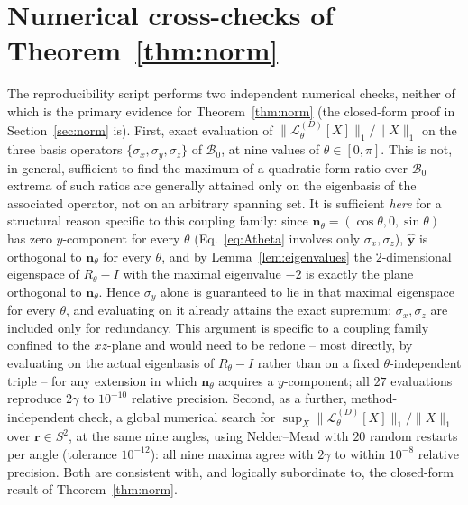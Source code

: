 \documentclass[aps,pra,reprint,superscriptaddress,nofootinbib,longbibliography]{revtex4-2}
\begin{document}
\section{Numerical cross-checks of Theorem~\ref{thm:norm}}
\label{app:numcheck}

The reproducibility script performs two independent numerical checks,
neither of which is the primary evidence for Theorem~\ref{thm:norm}
(the closed-form proof in Section~\ref{sec:norm} is). First, exact
evaluation of $\|\mathcal L^{(D)}_\theta[X]\|_1/\|X\|_1$ on the three
basis operators $\{\sigma_x,\sigma_y,\sigma_z\}$ of $\mathcal B_0$, at
nine values of $\theta\in[0,\pi]$. This is not, in general, sufficient
to find the maximum of a quadratic-form ratio over $\mathcal B_0$ --
extrema of such ratios are generally attained only on the eigenbasis of
the associated operator, not on an arbitrary spanning set. It is
sufficient \emph{here} for a structural reason specific to this
coupling family: since $\mathbf n_\theta=(\cos\theta,0,\sin\theta)$
has zero $y$-component for every $\theta$ (Eq.~\eqref{eq:Atheta}
involves only $\sigma_x,\sigma_z$), $\hat{\mathbf y}$ is orthogonal to
$\mathbf n_\theta$ for every $\theta$, and by Lemma~\ref{lem:eigenvalues}
the $2$-dimensional eigenspace of $R_\theta-I$ with the maximal
eigenvalue $-2$ is exactly the plane orthogonal to $\mathbf n_\theta$.
Hence $\sigma_y$ alone is guaranteed to lie in that maximal eigenspace
for every $\theta$, and evaluating on it already attains the exact
supremum; $\sigma_x,\sigma_z$ are included only for redundancy. This
argument is specific to a coupling family confined to the $xz$-plane
and would need to be redone -- most directly, by evaluating on the
actual eigenbasis of $R_\theta-I$ rather than on a fixed
$\theta$-independent triple -- for any extension in which
$\mathbf n_\theta$ acquires a $y$-component; all $27$ evaluations
reproduce $2\gamma$ to
$10^{-10}$ relative precision. Second, as a further, method-independent
check, a global numerical search for $\sup_X\|\mathcal
L^{(D)}_\theta[X]\|_1/\|X\|_1$ over $\mathbf r\in S^2$, at the same
nine angles, using Nelder--Mead with $20$ random restarts per angle
(tolerance $10^{-12}$): all nine maxima agree with $2\gamma$ to within
$10^{-8}$ relative precision. Both are consistent with, and logically
subordinate to, the closed-form result of Theorem~\ref{thm:norm}.



\end{document}

